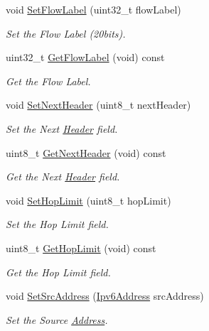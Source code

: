 \begin{DoxyCompactItemize}
void \hyperlink{classns3_1_1SixLowPanIphc_a53a4bed58a6f97e1953b61a40a3f11da}{Set\+Flow\+Label} (uint32\+\_\+t flow\+Label)
\begin{DoxyCompactList}\small\item\em Set the Flow Label (20bits). \end{DoxyCompactList}\item 
uint32\+\_\+t \hyperlink{classns3_1_1SixLowPanIphc_a4eb5f8420b9150918721a2edbd23140b}{Get\+Flow\+Label} (void) const 
\begin{DoxyCompactList}\small\item\em Get the Flow Label. \end{DoxyCompactList}\item 
void \hyperlink{classns3_1_1SixLowPanIphc_a02ab2cc846b2a6391e53bb062162be32}{Set\+Next\+Header} (uint8\+\_\+t next\+Header)
\begin{DoxyCompactList}\small\item\em Set the Next \hyperlink{classns3_1_1Header}{Header} field. \end{DoxyCompactList}\item 
uint8\+\_\+t \hyperlink{classns3_1_1SixLowPanIphc_a6e01ce18c03bf5468308fa0fa26199a0}{Get\+Next\+Header} (void) const 
\begin{DoxyCompactList}\small\item\em Get the Next \hyperlink{classns3_1_1Header}{Header} field. \end{DoxyCompactList}\item 
void \hyperlink{classns3_1_1SixLowPanIphc_afb167197fbe12d8e8ab65c7266d8dc10}{Set\+Hop\+Limit} (uint8\+\_\+t hop\+Limit)
\begin{DoxyCompactList}\small\item\em Set the Hop Limit field. \end{DoxyCompactList}\item 
uint8\+\_\+t \hyperlink{classns3_1_1SixLowPanIphc_ad2f29210dee03a3efc708fc932f5f2bf}{Get\+Hop\+Limit} (void) const 
\begin{DoxyCompactList}\small\item\em Get the Hop Limit field. \end{DoxyCompactList}\item 
void \hyperlink{classns3_1_1SixLowPanIphc_a55a9b41710bac0706ae61d6770b78e98}{Set\+Src\+Address} (\hyperlink{classns3_1_1Ipv6Address}{Ipv6\+Address} src\+Address)
\begin{DoxyCompactList}\small\item\em Set the Source \hyperlink{classns3_1_1Address}{Address}. \end{DoxyCompactList}\item 

\end{DoxyCompactItemize}
